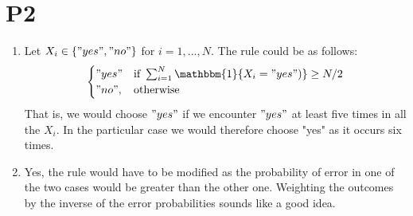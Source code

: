\documentclass{paper}
\begin{document}
\section*{P2}
\begin{enumerate}
\item 
Let $X_i\in{\{"yes", "no"\}}$ for $i=1,...,N$.
The rule could be as follows:
\begin{equation}
\begin{cases}
    "yes"& \text{if } \sum_{i=1}^{N} \mathbbm{1}\{X_i="yes")\} \geq N/2 \\
    "no",              & \text{otherwise}
\end{cases}
\end{equation}
That is, we would choose $"yes"$ if we encounter $"yes"$ at least five times in all the $X_i$. In the particular case we would therefore choose "yes" as it occurs six times.

\item
Yes, the rule would have to be modified as the probability of error in one of the two cases would be greater than the other one. Weighting the outcomes by the inverse of the error probabilities sounds like a good idea.



\end{enumerate}

 
\end{document}
